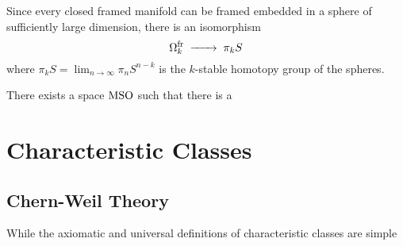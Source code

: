 \begin{corollary}
	Since every closed framed manifold can be framed embedded in a sphere of sufficiently large dimension, there is an isomorphism
	\begin{equation}
		\Omega^\fr_k \lkxto \pi_k S
	\end{equation}
	where $\pi_k S = \lim_{n\to\infty} \pi_n S^{n-k}$ is the $k$-stable homotopy group of the spheres.
\end{corollary}

\begin{theorem}
	There exists a space $\mathrm{MSO}$ such that there is a
\end{theorem}

\section{Characteristic Classes}

\subsection{Chern-Weil Theory}

While the axiomatic and universal definitions of characteristic classes are simple 
